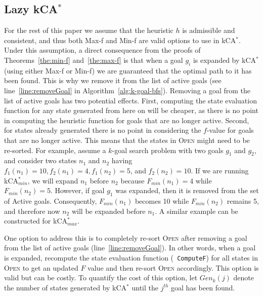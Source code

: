 \documentclass{aicom2e}
\newcommand{\kgs}{$k$-goal search}
\newcommand{\kastar}{kCA$^*$}
\newcommand{\kastarmin}{kCA$^*_{min}$}
\newcommand{\kastarmax}{kCA$^*_{max}$}
\newcommand{\minf}{Min-f}
\newcommand{\maxf}{Max-f}
\newcommand{\open}{\textsc{Open}}
\begin{document}
\subsection{Lazy \kastar{}}
\label{sec:lazy}

For the rest of this paper we assume that the heuristic $h$ is admissible and
consistent, and thus both \maxf{} and \minf{} are valid options to use in
\kastar{}. Under this assumption, a direct consequence from the proofs of
Theorems~\ref{the:min-f} and~\ref{the:max-f} is that when a goal $g_i$ is
expanded by \kastar{} (using either \maxf{} or \minf{}) we are guaranteed that
the optimal path to it has been found. This is why we remove it from the list
of active goals (see line~\ref{line:removeGoal} in
Algorithm~\ref{alg:k-goal-bfs}). Removing a goal from the list of active goals
has two potential effects. First, computing the state evaluation function for
any state generated from here on will be cheaper, as there is no point in
computing the heuristic function for goals that are no longer active. Second,
for states already generated there is no point in considering the $f$-value for
goals that are no longer active. This means that the states in \open{} might
need to be re-sorted. For example, assume a \kgs{} problem with two goals $g_1$
and $g_2$, and consider two states $n_1$ and $n_2$ having $f_1(n_1)=10,
f_2(n_1)=4, f_1(n_2)=5$, and $f_2(n_2)=10$. If we are running \kastarmin{}, we
will expand $n_1$ before $n_2$ because $F_{min}(n_1)=4$ while $F_{min}(n_2)=5$.
However, if goal $g_1$ was expanded, then it is removed from the set of Active
goals. Consequently, $F_{min}(n_1)$ becomes 10 while $F_{min}(n_2)$ remains 5,
and therefore now $n_2$ will be expanded before $n_1$. A similar example can be
constructed for \kastarmax{}.



One option to address this is to completely re-sort \open{} after removing a
goal from the list of active goals (line~\ref{line:removeGoal}). In other
words, when a goal is expanded, recompute the state evaluation function ({\tt
ComputeF}) for all states in \open{} to get an updated $F$ value and then
re-sort \open{} accordingly. This option is valid but can be costly. To
quantify the cost of this option, let $Gen_k(j)$ denote the number of states
generated by \kastar{} until the $j^{th}$ goal has been found.

\end{document}

